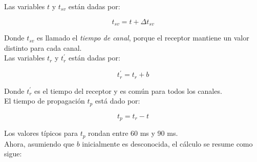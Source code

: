 Las variables $t$ y $t_{sv}$ están dadas por: 

\begin{equation}
\label{Eq:tsv}
t_{sv} = t + \Delta t_{sv}
\end{equation}

Donde $t_{sv}$ es llamado el \textit{tiempo de canal}, porque el receptor mantiene un valor distinto para cada canal.\\

Las variables $t_r$ y $t^{'}_r$ están dadas por:

\begin{equation}
\label{Eq:t_r}
t^{'}_r = t_r + b
\end{equation}

Donde $t^{'}_r$ es el tiempo del receptor y es común para todos los canales. \\

El tiempo de propagación $t_p$ está dado por:

\begin{equation}
\label{Eq:t_p}
t_p = t_r - t
\end{equation}

Los valores típicos para $t_p$ rondan entre 60 ms y 90 ms. \\

Ahora, asumiendo que $b$ inicialmente es desconocida, el cálculo se resume como sigue:\\

